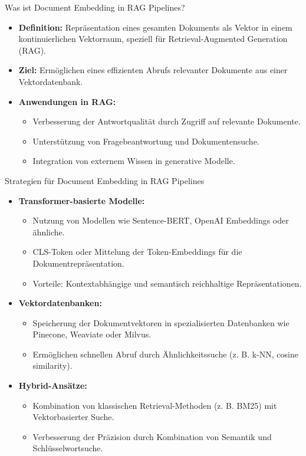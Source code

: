 \documentclass[aspectratio=1610, xcolor=dvipsnames, 9pt]{beamer}
\begin{document}
\begin{frame}{Was ist Document Embedding in RAG Pipelines?}
  \begin{itemize}
    \item \textbf{Definition:} Repräsentation eines gesamten Dokuments als Vektor in einem kontinuierlichen Vektorraum, speziell für Retrieval-Augmented Generation (RAG).
    \item \textbf{Ziel:} Ermöglichen eines effizienten Abrufs relevanter Dokumente aus einer Vektordatenbank.
    \item \textbf{Anwendungen in RAG:}
      \begin{itemize}
        \item Verbesserung der Antwortqualität durch Zugriff auf relevante Dokumente.
        \item Unterstützung von Fragebeantwortung und Dokumentensuche.
        \item Integration von externem Wissen in generative Modelle.
      \end{itemize}
  \end{itemize}
\end{frame}

\begin{frame}{Strategien für Document Embedding in RAG Pipelines}
  \begin{itemize}
    \item \textbf{Transformer-basierte Modelle:}
      \begin{itemize}
        \item Nutzung von Modellen wie Sentence-BERT, OpenAI Embeddings oder ähnliche.
        \item CLS-Token oder Mittelung der Token-Embeddings für die Dokumentrepräsentation.
        \item Vorteile: Kontextabhängige und semantisch reichhaltige Repräsentationen.
      \end{itemize}
    \item \textbf{Vektordatenbanken:}
      \begin{itemize}
        \item Speicherung der Dokumentvektoren in spezialisierten Datenbanken wie Pinecone, Weaviate oder Milvus.
        \item Ermöglichen schnellen Abruf durch Ähnlichkeitssuche (z. B. k-NN, cosine similarity).
      \end{itemize}
    \item \textbf{Hybrid-Ansätze:}
      \begin{itemize}
        \item Kombination von klassischen Retrieval-Methoden (z. B. BM25) mit Vektorbasierter Suche.
        \item Verbesserung der Präzision durch Kombination von Semantik und Schlüsselwortsuche.
      \end{itemize}
  \end{itemize}
\end{frame}
\end{document}
